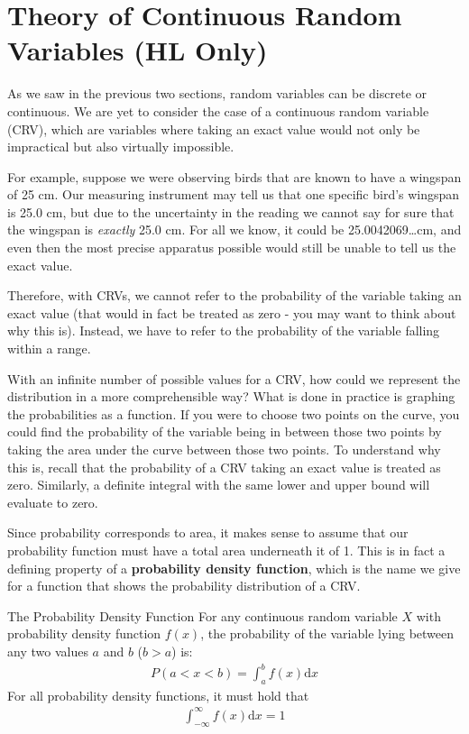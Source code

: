 \documentclass[../../main.tex]{subfiles}
\begin{document}
\newpage

\section{Theory of Continuous Random Variables (HL Only)}
As we saw in the previous two sections, random variables can be discrete or continuous. We are yet to consider the case of a continuous random variable (CRV), which are variables where taking an exact value would not only be impractical but also virtually impossible.

For example, suppose we were observing birds that are known to have a wingspan of 25 cm. Our measuring instrument may tell us that one specific bird's wingspan is 25.0 cm, but due to the uncertainty in the reading we cannot say for sure that the wingspan is \textit{exactly} 25.0 cm. For all we know, it could be 25.0042069\dots cm, and even then the most precise apparatus possible would still be unable to tell us the exact value. 

Therefore, with CRVs, we cannot refer to the probability of the variable taking an exact value (that would in fact be treated as zero - you may want to think about why this is). Instead, we have to refer to the probability of the variable falling within a range.

With an infinite number of possible values for a CRV, how could we represent the distribution in a more comprehensible way? What is done in practice is graphing the probabilities as a function. If you were to choose two points on the curve, you could find the probability of the variable being in between those two points by taking the area under the curve between those two points. To understand why this is, recall that the probability of a CRV taking an exact value is treated as zero. Similarly, a definite integral with the same lower and upper bound will evaluate to zero.

Since probability corresponds to area, it makes sense to assume that our probability function must have a total area underneath it of 1. This is in fact a defining property of a \textbf{probability density function}, which is the name we give for a function that shows the probability distribution of a CRV.

\begin{theorem}{The Probability Density Function}
For any continuous random variable $X$ with probability density function $f(x)$, the probability of the variable lying between any two values $a$ and $b$ ($b > a$) is:
\begin{align}
    P(a<x<b) = \int_a^b f(x) \mathrm dx
\end{align}
For all probability density functions, it must hold that
\begin{align}
    \int_{-\infty}^{\infty} f(x) \mathrm dx = 1
\end{align}
\end{theorem}
\end{document}
